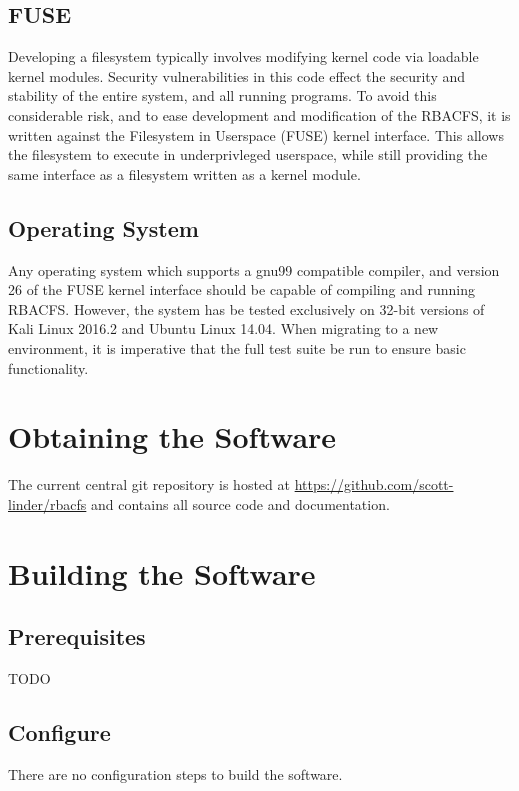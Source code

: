 \documentclass[11pt,oneside,letterpaper,twocolumn]{article}
\begin{document}
\subsection{FUSE}

Developing a filesystem typically involves modifying kernel code via loadable
kernel modules. Security vulnerabilities in this code effect the security and
stability of the entire system, and all running programs. To avoid this
considerable risk, and to ease development and modification of the RBACFS, it
is written against the Filesystem in Userspace (FUSE) kernel interface. This
allows the filesystem to execute in underprivleged userspace, while still
providing the same interface as a filesystem written as a kernel module.

\subsection{Operating System}

Any operating system which supports a gnu99 compatible compiler, and version 26
of the FUSE kernel interface should be capable of compiling and running RBACFS.
However, the system has be tested exclusively on 32-bit versions of Kali Linux
2016.2 and Ubuntu Linux 14.04. When migrating to a new environment, it is
imperative that the full test suite be run to ensure basic functionality.

\section{Obtaining the Software}

The current central git repository is hosted at
\url{https://github.com/scott-linder/rbacfs} and contains all source code and
documentation.

\section{Building the Software}

\subsection{Prerequisites}

TODO

\subsection{Configure}

There are no configuration steps to build the software.
\end{document}
